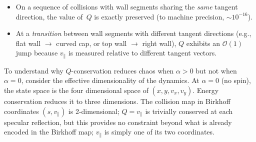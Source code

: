 \documentclass[aps,prd,twocolumn,superscriptaddress,nofootinbib,floatfix]{revtex4-2}
\begin{document}
\begin{itemize}
    \item On a sequence of collisions with wall segments sharing the \emph{same} tangent direction, the value of~$Q$ is exactly preserved (to machine precision, $\sim 10^{-16}$).
    \item At a \emph{transition} between wall segments with different tangent directions (e.g., flat wall $\to$ curved cap, or top wall $\to$ right wall), $Q$ exhibits an $\mathcal{O}(1)$ jump because $v_\parallel$ is measured relative to different tangent vectors.
\end{itemize}
\noindent
To understand why $Q$-conservation reduces chaos when $\alpha > 0$ but not when $\alpha = 0$, consider the effective dimensionality of the dynamics. At $\alpha = 0$ (no spin), the state space is the four dimensional space of $(x, y, v_x, v_y)$. Energy conservation reduces it to three dimensions. The collision map in Birkhoff coordinates $(s, v_\parallel)$ is 2-dimensional; $Q = v_\parallel$ is trivially conserved at each specular reflection, but this provides no constraint beyond what is already encoded in the Birkhoff map; $v_\parallel$ is simply one of its two coordinates.\\
\end{document}
